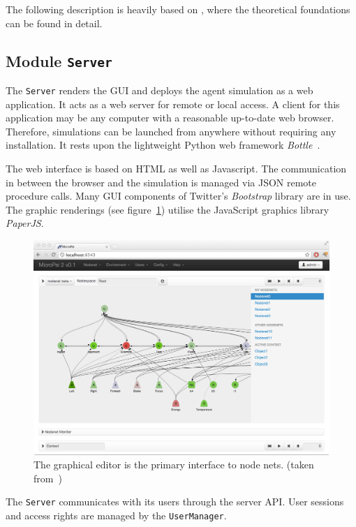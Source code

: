 The following description is heavily based on \cite{conf/agi/Bach12}, where the theoretical foundations can be found in detail.

        \subsection{Module \texttt{Server}}
The \texttt{Server} renders the GUI and deploys the agent simulation as a web application. It acts as a web server for remote or local access. A client for this application may be any computer with a reasonable up-to-date web browser. Therefore, simulations can be launched from anywhere without requiring any installation. It rests upon the lightweight Python web framework \emph{Bottle}~\cite{bottlepy}.

The web interface is based on HTML as well as Javascript. The communication in between the browser and the simulation is managed via JSON remote procedure calls. Many GUI components of Twitter's \emph{Bootstrap} library are in use. The graphic renderings (see figure~\ref{micropsi2_nodenet}) utilise the JavaScript graphics library \emph{PaperJS}. 

\begin{figure}[h]
  \centering
    \includegraphics[width=13cm]{graphics/micropsi2_nodenet}
  \caption{The graphical editor is the primary interface to node nets. (taken from~\cite{conf/agi/Bach12})}
  \label{micropsi2_nodenet}
\end{figure}

The \texttt{Server} communicates with its users through the server API. User sessions and access rights are managed by the \texttt{UserManager}.
   
